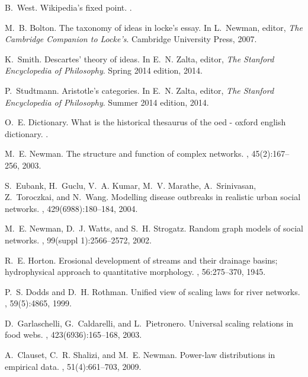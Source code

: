 \documentclass[pre,twocolumn,twoside,superscriptaddress,floatfix]{revtex4-1}
\begin{document}
{\begin{thebibliography}{10}
B.~West.
\newblock Wikipedia's fixed point.
.

M.~B. Bolton.
\newblock The taxonomy of ideas in locke's essay.
\newblock In L.~Newman, editor, {\em The Cambridge Companion to Locke's}.
  Cambridge University Press, 2007.

K.~Smith.
\newblock Descartes' theory of ideas.
\newblock In E.~N. Zalta, editor, {\em The Stanford Encyclopedia of
  Philosophy}. Spring 2014 edition, 2014.

P.~Studtmann.
\newblock Aristotle's categories.
\newblock In E.~N. Zalta, editor, {\em The Stanford Encyclopedia of
  Philosophy}. Summer 2014 edition, 2014.

O.~E. Dictionary.
\newblock What is the historical thesaurus of the oed - oxford english
  dictionary.
.

M.~E. Newman.
\newblock The structure and function of complex networks.
, 45(2):167--256, 2003.

S.~Eubank, H.~Guclu, V.~A. Kumar, M.~V. Marathe, A.~Srinivasan, Z.~Toroczkai,
  and N.~Wang.
\newblock Modelling disease outbreaks in realistic urban social networks.
, 429(6988):180--184, 2004.

M.~E. Newman, D.~J. Watts, and S.~H. Strogatz.
\newblock Random graph models of social networks.
, 99(suppl
  1):2566--2572, 2002.

R.~E. Horton.
\newblock Erosional development of streams and their drainage basins;
  hydrophysical approach to quantitative morphology.
, 56:275--370, 1945.

P.~S. Dodds and D.~H. Rothman.
\newblock Unified view of scaling laws for river networks.
, 59(5):4865, 1999.

D.~Garlaschelli, G.~Caldarelli, and L.~Pietronero.
\newblock Universal scaling relations in food webs.
, 423(6936):165--168, 2003.

A.~Clauset, C.~R. Shalizi, and M.~E. Newman.
\newblock Power-law distributions in empirical data.
, 51(4):661--703, 2009.


\end{thebibliography}}
\end{document}
